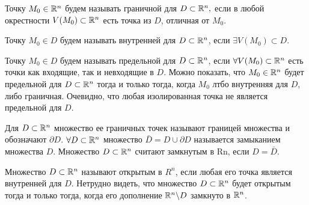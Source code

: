 \documentclass[../main.tex]{subfiles}
\begin{document}
	Точку $M_0 \in \mathbb{R}^n$ будем называть граничной для $D \subset \mathbb{R}^n,$ если в любой окрестности $V(M_0) \subset \mathbb{R}^n$ есть точка из $D$, отличная от $M_0$. 
	
	Точку $M_0 \in D$ будем называть внутренней для $D \subset \mathbb{R}^n$, если $\exists V(M_0) \subset D$.
	
	Точку $M_0 \in D$ будем называть предельной для $D \subset \mathbb{R}^n$, если $\forall V(M_0) \subset \mathbb{R}^n$ есть точки как входящие, так и невходящие в $D$.
	Можно показать, что $M_0 \in \mathbb{R}^n$ будет предельной для $D \subset \mathbb{R}^n$ тогда и только тогда, когда $M_0$ лтбо внутренняя для $D$, либо граничная.
	Очевидно, что любая изолированная точка не является предельной для $D$.
	
	Для $D \subset \mathbb{R}^n$ множество ее граничных точек называют границей множества  и обозначают $\partial D$. 
	$\forall D \subset \mathbb{R}^n$ множество $\bar D = D \cup \partial D$ называется замыканием множества $D$. 
	Множество $D \subset \mathbb{R}^n$ считают замкнутым в Rn, если  $D = \bar D$.
	
	Множество $D \subset \mathbb{R}^n$ называют открытым в $R^n$, если любая его точка является внутренней для $D$. Нетрудно видеть, что множество $D \subset \mathbb{R}^n$ будет открытым тогда и только тогда, когда его дополнение $\mathbb{R}^n \backslash D$ замкнуто в $\mathbb{R}^n$. 
	
	
% 
% 
\end{document}
